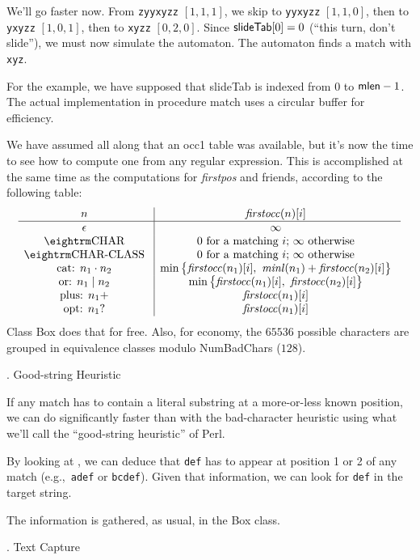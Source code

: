 We'll go faster now.  From {\tt zyyxyzz} $[1, 1, 1]$, we skip to {\tt yyxyzz} $[1, 1, 0]$, then to {\tt yxyzz} $[1, 0, 1]$, then to {\tt xyzz} $[0, 2, 0]$.  Since $\hbox{\sf slideTab}[0] = 0$ (``this turn, don't slide''), we must now simulate the automaton.  The automaton finds a match with {\tt xyz}.

For the example, we have supposed that {\sf slideTab} is indexed from $0$ to $\hbox{\sf mlen} - 1$.  The actual implementation in procedure {\sf match} uses a circular buffer for efficiency.

We have assumed all along that an {\sf occ1} table was available, but it's now the time to see how to compute one from any regular expression.  This is accomplished at the same time as the computations for {\it firstpos} and friends, according to the following table:  $$\vbox{\halign{\g{#}\vrule && \g{$#$} \cr
  $n$                   & {\it firstocc}(n)[i] \cr
\noalign{\hrule}
  $\epsilon$            & \infty \cr
  \tok{char}            & \hbox{$0$ for a matching $i$; $\infty$ otherwise} \cr
  \tok{char-class}      & \hbox{$0$ for a matching $i$; $\infty$ otherwise} \cr
  cat: $n_1 \cdot n_2$  & \min\smash{\bigl\{}{\it firstocc}(n_1)[i],\ {\it minl}(n_1) + {\it firstocc}(n_2)[i]\smash{\bigr\}} \cr
  or: $n_1 \mid n_2$    & \min\smash{\bigl\{}{\it firstocc}(n_1)[i],\ {\it firstocc}(n_2)[i]\smash{\bigr\}} \cr
  plus: $n_1+$          & {\it firstocc}(n_1)[i] \cr
  opt: $n_1?$           & {\it firstocc}(n_1)[i] \cr
}}$$  Class {\sf Box} does that for free.  Also, for economy, the $65536$ possible characters are grouped in equivalence classes modulo {\sf NumBadChars} ($128$).

. Good-string Heuristic

If any match has to contain a literal substring at a more-or-less known position, we can do significantly faster than with the bad-character heuristic using what we'll call the ``good-string heuristic'' of Perl.

By looking at , we can deduce that {\tt def} has to appear at position 1 or 2 of any match (e.g.,~{\tt adef} or {\tt bcdef}).  Given that information, we can look for {\tt def} in the target string.

The information is gathered, as usual, in the {\sf Box} class.

. Text Capture

